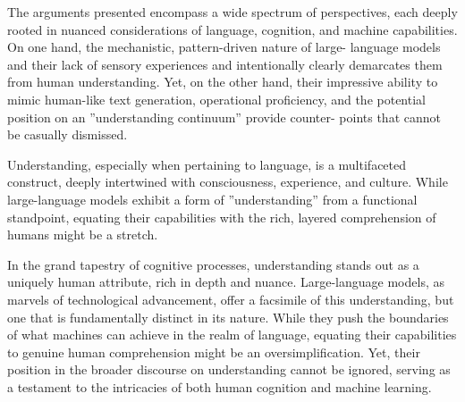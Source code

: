 \documentclass{article}
\begin{document}
The arguments presented encompass a wide spectrum of perspectives, each
deeply rooted in nuanced considerations of language, cognition, and machine
capabilities. 
On one hand, the mechanistic, pattern-driven nature of large-
language models and their lack of sensory experiences and intentionally clearly
demarcates them from human understanding. Yet, on the other hand, their
impressive ability to mimic human-like text generation, operational proficiency,
and the potential position on an ”understanding continuum” provide counter-
points that cannot be casually dismissed.

Understanding, especially when pertaining to language, is a multifaceted
construct, deeply intertwined with consciousness, experience, and culture. While
large-language models exhibit a form of ”understanding” from a functional
standpoint, equating their capabilities with the rich, layered comprehension of
humans might be a stretch.

In the grand tapestry of cognitive processes, understanding stands out as a
uniquely human attribute, rich in depth and nuance. Large-language models,
as marvels of technological advancement, offer a facsimile of this understanding, but one that is fundamentally distinct in its nature. While they push the
boundaries of what machines can achieve in the realm of language, equating
their capabilities to genuine human comprehension might be an oversimplification. Yet, their position in the broader discourse on understanding cannot be
ignored, serving as a testament to the intricacies of both human cognition and
machine learning.


 
\end{document}
